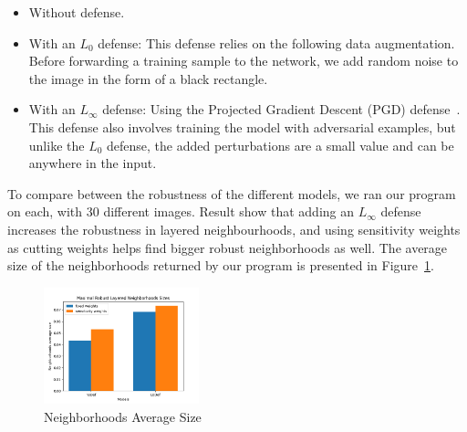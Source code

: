\begin{itemize}
    \item Without defense. %
      \item With an $L_0$ defense: This defense relies on the following data augmentation.
    Before forwarding a training sample to the network, we add random noise to the image in the form of a black rectangle.
        \item With an $L_{\infty}$ defense: Using the Projected Gradient Descent (PGD) defense~\cite{PGD}.
    This defense also involves training the model with adversarial examples, but unlike the $L_0$ defense, the added perturbations are a small value and can be anywhere in the input.
\end{itemize} 

To compare between the robustness of the different models, we ran our program on each, with 30 different images.
Result show that adding an $L_{\infty}$ defense increases the robustness in layered neighbourhoods, and using sensitivity weights as cutting weights helps find bigger robust neighborhoods as well.
The average size of the neighborhoods returned by our program is presented in Figure~\ref{fig:neighborhoods_average_size}.
\begin{figure}
    \centering
    \includegraphics[width=0.4\textwidth]{neighborhoods_average_size.png}
    \caption{Neighborhoods Average Size}
    \label{fig:neighborhoods_average_size}
\end{figure}

